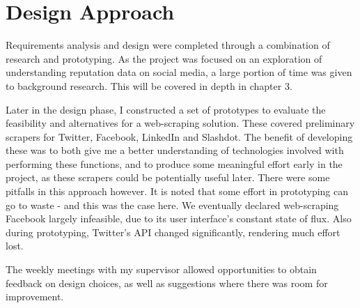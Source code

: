 



\section{Design Approach}

Requirements analysis and design were completed through a combination of research and prototyping. As the project was focused on an exploration of understanding reputation data on social media, a large portion of time was given to background research. This will be covered in depth in chapter 3.

Later in the design phase, I constructed a set of prototypes to evaluate the feasibility and alternatives for a web-scraping solution. These covered preliminary scrapers for Twitter, Facebook, LinkedIn and Slashdot. The benefit of developing these was to both give me a better understanding of technologies involved with performing these functions, and to produce some meaningful effort early in the project, as these scrapers could be potentially useful later. There were some pitfalls in this approach however. It is noted that some effort in prototyping can go to waste - and this was the case here. We eventually declared web-scraping Facebook largely infeasible, due to its user interface's constant state of flux. Also during prototyping, Twitter's API changed significantly, rendering much effort lost. 

The weekly meetings with my supervisor allowed opportunities to obtain feedback on design choices, as well as suggestions where there was room for improvement. 



